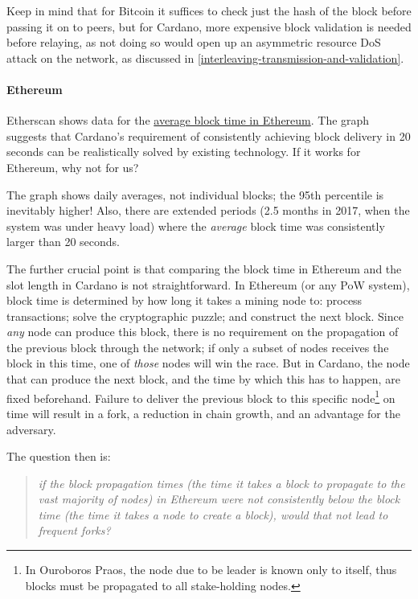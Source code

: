 \documentclass[11pt,a4paper]{article}
\begin{document}
Keep in mind that for Bitcoin it suffices to check just the hash of the
block before passing it on to peers, but for Cardano, more expensive
block validation is needed before relaying, as not doing so would open
up an asymmetric resource DoS attack on the network, as discussed in
\cref{interleaving-transmission-and-validation}.

\paragraph{Ethereum}
\label{ethereum}

Etherscan shows data for the
\href{https://etherscan.io/chart/blocktime}{{average block time in
Ethereum}}. The graph suggests that Cardano's requirement of
consistently achieving block delivery in 20 seconds can be realistically
solved by existing technology. If it works for Ethereum, why not for us?

The graph shows daily averages, not individual blocks; the 95th
percentile is inevitably higher! Also, there are extended periods (2.5
months in 2017, when the system was under heavy load) where the
\emph{average} block time was consistently larger than 20 seconds.

The further crucial point is that comparing the block time in Ethereum
and the slot length in Cardano is not straightforward. In Ethereum (or
any PoW system), block time is determined by how long it takes a mining
node to: process transactions; solve the cryptographic puzzle; and
construct the next block. Since \emph{any} node can produce this block,
there is no requirement on the propagation of the previous block through
the network; if only a subset of nodes receives the block in this time,
one of \emph{those} nodes will win the race. But in Cardano, the node
that can produce the next block, and the time by which this has to
happen, are fixed beforehand. Failure to deliver the previous block to
this specific node\footnote{In Ouroboros Praos, the node due to be
  leader is known only to itself, thus blocks must be propagated to all
  stake-holding nodes.} on time will result in a fork, a reduction in
chain growth, and an advantage for the adversary.

The question then is:

\begin{quote}
\emph{if the block propagation times (the time it takes a block to
propagate to the vast majority of nodes) in Ethereum were not
consistently below the block time (the time it takes a node to create a
block), would that not lead to frequent forks?}
\end{quote}
\end{document}
